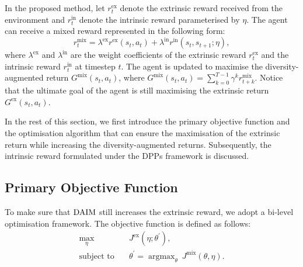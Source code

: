In the proposed method, let $r_{t}^{\text{ex}}$ denote the extrinsic reward received from the environment and $r^{\text{in}}_{t}$ denote the intrinsic reward parameterised by $\eta$. The agent can receive a mixed reward represented in the following form:
\begin{equation}
    r^{\text{mix}}_t = \lambda^{\text{ex}} r^{\text{ex}}(s_{t}, a_t) + \lambda^{\text{in}} r^{\text{in}}(s_t, s_{t+1};\eta),
\end{equation}
where $\lambda^{\text{ex}}$ and $\lambda^{\text{in}}$ are the weight coefficients of the extrinsic reward $r^{\text{ex}}_{t}$ and the intrinsic reward $r^{\text{in}}_{t}$ at timestep $t$. The agent is updated to maximise the diversity-augmented return $G^{\text{mix}}(s_t,a_t)$, where $G^{\text{mix}}(s_t,a_t) =\sum_{k=0}^{T-1}\gamma^{k}r^{\text{mix}}_{t+k}$. Notice that the ultimate goal of the agent is still maximising the extrinsic return $G^{\text{ex}}(s_{t}, a_{t})$. 

In the rest of this section, we first introduce the primary objective function and the optimisation algorithm that can ensure the maximisation of the extrinsic return while increasing the diversity-augmented returns. Subsequently, the intrinsic reward formulated under the DPPs framework is discussed.

\subsection{Primary Objective Function}
To make sure that $\text{DAIM}$ still increases the extrinsic reward, we adopt a bi-level optimisation framework. The objective function is defined as follows:
\begin{align}
  \label{eq:obj}
  \max_{\eta}\quad & J^{\text{ex}}(\eta;\theta^{\prime}),\\ 
  \text{subject to}\quad & \theta^{\prime} =\mathop{\arg\max}_{\theta}\ J^{\text{mix}}(\theta, \eta).
  \nonumber
\end{align}

